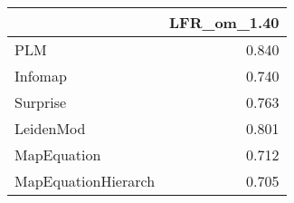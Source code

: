 \begin{tabular}{lr}
\toprule
{} & LFR_om_1.40 \\
\midrule
PLM                 &       0.840 \\
Infomap             &       0.740 \\
Surprise            &       0.763 \\
LeidenMod           &       0.801 \\
MapEquation         &       0.712 \\
MapEquationHierarch &       0.705 \\
\bottomrule
\end{tabular}
